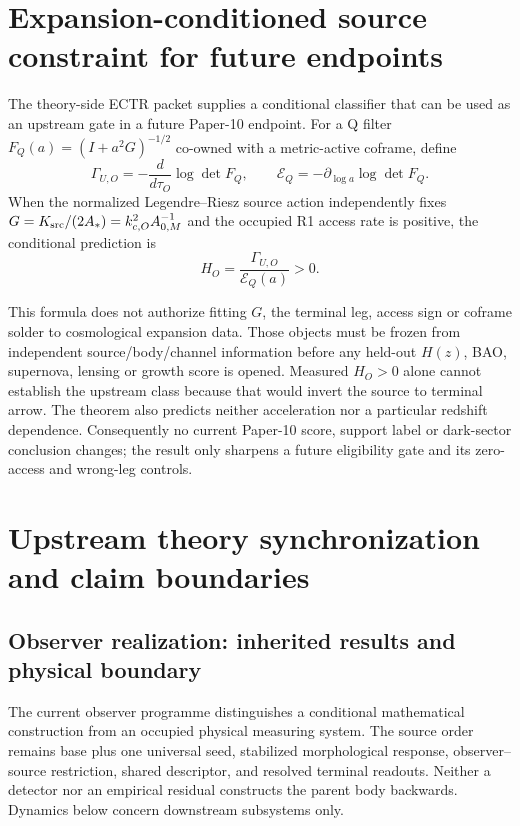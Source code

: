 \documentclass[11pt]{article}
\begin{document}
\section{Expansion-conditioned source constraint for future endpoints}

The theory-side ECTR packet supplies a conditional classifier that can be
used as an upstream gate in a future Paper-10 endpoint.  For a Q filter
$F_Q(a)=(I+a^2G)^{-1/2}$ co-owned with a metric-active coframe, define
\begin{equation}
 \Gamma_{U,O}=-\frac{d}{d\tau_O}\log\det F_Q,
 \qquad
 \mathcal E_Q=-\partial_{\log a}\log\det F_Q.
 \label{eq:p10-ectr-definitions}
\end{equation}
When the normalized Legendre--Riesz source action independently fixes
$G=K_{\rm src}/(2A_*)=k_{c,O}^2A_{0,M}^{-1}$ and the occupied R1 access rate
is positive, the conditional prediction is
\begin{equation}
 \boxed{H_O=\frac{\Gamma_{U,O}}{\mathcal E_Q(a)}>0.}
 \label{eq:p10-ectr-classifier}
\end{equation}

This formula does not authorize fitting $G$, the terminal leg, access sign or
coframe solder to cosmological expansion data.  Those objects must be frozen
from independent source/body/channel information before any held-out $H(z)$,
BAO, supernova, lensing or growth score is opened.  Measured $H_O>0$ alone
cannot establish the upstream class because that would invert the source to
terminal arrow.  The theorem also predicts neither acceleration nor a
particular redshift dependence.  Consequently no current Paper-10 score,
support label or dark-sector conclusion changes; the result only sharpens a
future eligibility gate and its zero-access and wrong-leg controls.

\section{Upstream theory synchronization and claim boundaries}
\label{sec:observer-update-20260914}

\subsection{Observer realization: inherited results and physical boundary}
The current observer programme distinguishes a conditional mathematical
construction from an occupied physical measuring system. The source order
remains base plus one universal seed, stabilized morphological response,
observer--source restriction, shared descriptor, and resolved terminal
readouts. Neither a detector nor an empirical residual constructs the parent
body backwards. Dynamics below concern downstream subsystems only.
\end{document}
